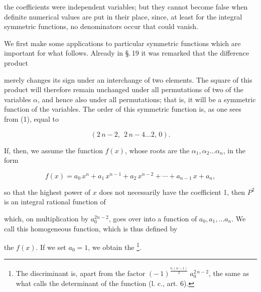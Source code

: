 the coefficients were independent variables; but they cannot
become false when definite numerical values are put in their
place, since, at least for the integral symmetric functions, no
denominators occur that could vanish.

We first make some applications to particular symmetric
functions which are important for what follows. Already in
\S.\,19 it was remarked that the difference product


merely changes its sign under an interchange of two elements.
The square of this product will therefore remain unchanged
under all permutations of two of the variables $\alpha$, and hence
also under all permutations; that is, it will be a symmetric function
of the variables. The order of this symmetric function
is, as one sees from (1), equal to

\[
(2\,n - 2,\ \ 2\,n - 4 \ldots 2,\, 0).
\]

If, then, we assume the function $f(x)$, whose roots are the $\alpha_1, \alpha_2 \ldots \alpha_n$,
in the form

\[
f(x) = a_0\,x^n + a_1\,x^{n-1} + a_2\,x^{n-2} + \cdots + a_{n-1}\,x + a_n,
\]

so that the highest power of $x$ does not necessarily have the coefficient
1, then $P^2$ is an integral rational function of


which, on multiplication by $a_0^{2n-2}$, goes over into a  function
of $a_0, a_1, \ldots a_n$. We call this homogeneous function,
which is thus defined by


the  $f(x)$. If we set
$a_0 = 1$, we obtain the \footnote{The discriminant is, apart from the factor $(-\,1)^{\frac{n\,(n-1)}{2}}\ a_0^{2\,n-2}$,
the same as what  calls the determinant of the function (l. c., art. 6).}.
